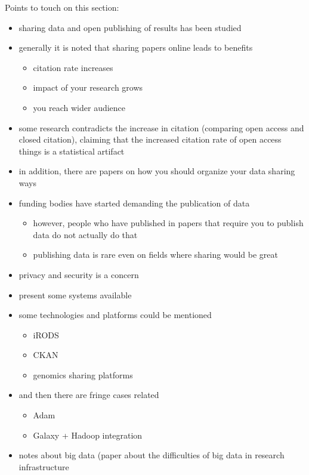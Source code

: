 Points to touch on this section:

\begin{itemize}
    \item sharing data and open publishing of results has been studied
    \item generally it is noted that sharing papers online leads to benefits
    \begin{itemize}
        \item citation rate increases
        \item impact of your research grows
        \item you reach wider audience
    \end{itemize}
    \item some research contradicts the increase in citation (comparing open
          access and closed citation), claiming that the increased citation
          rate of open access things is a statistical artifact
    \item in addition, there are papers on how you should organize your data
          sharing ways
    \item funding bodies have started demanding the publication of data
    \begin{itemize}
        \item however, people who have published in papers that require you
              to publish data do not actually do that
        \item publishing data is rare even on fields where sharing would be
              great
    \end{itemize}
    \item privacy and security is a concern
    \item present some systems available
    \item some technologies and platforms could be mentioned
    \begin{itemize}
        \item iRODS
        \item CKAN
        \item genomics sharing platforms
    \end{itemize}
    \item and then there are fringe cases related
    \begin{itemize}
        \item Adam
        \item Galaxy + Hadoop integration
    \end{itemize}
    \item notes about big data (paper about the difficulties of big data in
          research infrastructure
\end{itemize}

